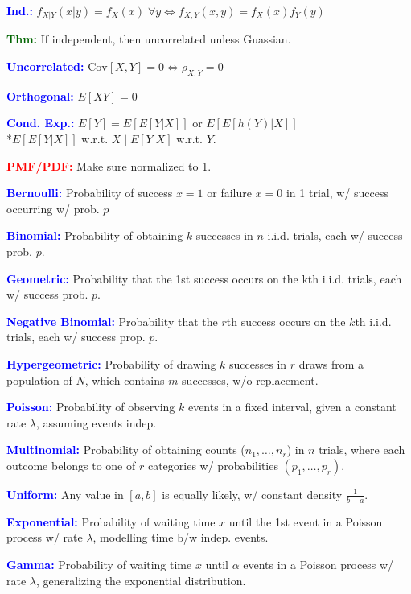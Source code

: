 \documentclass[5pt]{extarticle} %
\begin{document}
\begin{paracol}{3}
{    \textcolor{blue}{\textbf{Ind.:}} $f_{X|Y}(x|y) = f_X(x) \; \forall y \Leftrightarrow f_{X,Y}(x, y) = f_X(x) f_Y(y) $ 
    
    \textcolor{darkgreen}{\textbf{Thm:}} If independent, then uncorrelated unless Guassian.

    \textcolor{blue}{\textbf{Uncorrelated:}} $\text{Cov}[X, Y] = 0 \Leftrightarrow \rho_{X,Y} = 0$

    \textcolor{blue}{\textbf{Orthogonal:}} $E[XY] = 0$

    \textcolor{blue}{\textbf{Cond. Exp.:}} $E[Y] = E[E[Y|X]]$ or $E[E[h(Y)|X]]$ \\
    *$E[E[Y|X]]$ w.r.t. $X \mid E[Y|X]$ w.r.t. $Y$. 

    \textcolor{red}{\textbf{PMF/PDF:}} Make sure normalized to 1. 
     
    \textcolor{blue}{\textbf{Bernoulli:}} Probability of success $x=1$ or failure $x=0$ in 1 trial, w/ success occurring w/ prob. $p$ 

    \textcolor{blue}{\textbf{Binomial:}} Probability of obtaining $k$ successes in $n$ i.i.d. trials, each w/ success prob. $p$. 

    \textcolor{blue}{\textbf{Geometric:}} Probability that the 1st success occurs on the kth i.i.d. trials, each w/ success prob. $p$. 

    \textcolor{blue}{\textbf{Negative Binomial:}} Probability that the $r$th success occurs on the $k$th i.i.d. trials, each w/ success prop. $p$. 

    \textcolor{blue}{\textbf{Hypergeometric:}} Probability of drawing $k$ successes in $r$ draws from a population of $N$, which contains $m$ successes, w/o replacement. 

    \textcolor{blue}{\textbf{Poisson:}} Probability of observing $k$ events in a fixed interval, given a constant rate $\lambda$, assuming events indep.

    \textcolor{blue}{\textbf{Multinomial:}} Probability of obtaining counts ($n_1,\ldots,n_r$) in $n$ trials, where each outcome belongs to one of $r$ categories w/ probabilities $(p_1,\ldots,p_r)$.

    \textcolor{blue}{\textbf{Uniform:}} Any value in $[a,b]$ is equally likely, w/ constant density $\frac{1}{b-a}$.

    \textcolor{blue}{\textbf{Exponential:}} Probability of waiting time $x$ until the 1st event in a Poisson process w/ rate $\lambda$, modelling time b/w indep. events. 

    \textcolor{blue}{\textbf{Gamma:}} Probability of waiting time $x$ until $\alpha$ events in a Poisson process w/ rate $\lambda$, generalizing the exponential distribution.

}
\end{paracol}
\end{document}
